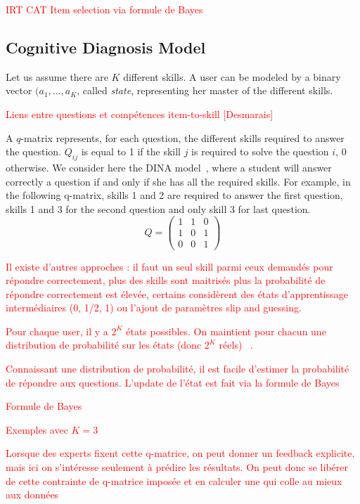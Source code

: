\documentclass{sig-alternate}
\newcommand\alert[1]{\textcolor{red}{#1}}
\begin{document}
\alert{IRT CAT}
\alert{Item selection via formule de Bayes}

\subsection{Cognitive Diagnosis Model}

Let us assume there are $K$ different skills. A user can be modeled by a binary vector $(a_1, \ldots, a_K$, called \emph{state}, representing her master of the different skills. 

\alert{Liens entre questions et compétences item-to-skill [Desmarais]}

A $q$-matrix \cite{Tatsuoka1983} represents, for each question, the different skills required to answer the question. $Q_{ij}$ is equal to 1 if the skill $j$ is required to solve the question $i$, 0 otherwise. We consider here the DINA model~\cite{Desmarais2012}, where a student will answer correctly a question if and only if she has all the required skills. For example, in the following q-matrix, skills 1 and 2 are required to answer the first question, skills 1 and 3 for the second question and only skill 3 for last question. %
\[ Q = \left(\begin{array}{lll}
1 & 1 & 0\\
1 & 0 & 1\\
0 & 0 & 1
\end{array}\right) \]

\alert{Il existe d'autres approches : il faut un seul skill parmi ceux demandés pour répondre correctement, plus des skills sont maitrisés plus la probabilité de répondre correctement est élevée, certains considèrent des états d'apprentissage intermédiaires (0, 1/2, 1) ou l'ajout de paramètres slip and guessing. }

\alert{Pour chaque user, il y a $2^K$ états possibles. On maintient pour chacun une distribution de probabilité sur les états (donc $2^K$ réels) ~\cite{Huebner2010}.}

\alert{Connaissant une distribution de probabilité, il est facile d'estimer la probabilité de répondre aux questions. L'update de l'état est fait via la formule de Bayes}

\alert{Formule de Bayes}

\alert{Exemples avec $K = 3$}

\alert{Lorsque des experts fixent cette q-matrice, on peut donner un feedback explicite, mais ici on s'intéresse seulement à prédire les résultats. On peut donc se libérer de cette contrainte de q-matrice imposée et en calculer une qui colle au mieux aux données}
\end{document}

